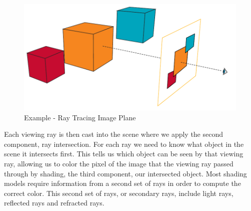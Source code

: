 \begin{figure}[!htb]
  \centering
  \includegraphics[width=\textwidth]{drawings/examples/cubes_visio_ray_tracing.pdf}
  \caption{Example - Ray Tracing Image Plane}
  \label{fig:image-plane}
\end{figure}

Each viewing ray is then cast into the scene where we apply the second component, 
ray intersection.  For each ray we need to know what object in the scene it 
intersects first.  This tells us which object can be seen by that viewing ray,
allowing us to color the pixel of the image that the viewing ray passed through
by shading, the third component, our intersected object.  Most shading models 
require information from a second set of rays in order to compute the correct 
color.  This second set of rays, or secondary rays, include light rays,
reflected rays and refracted rays.
